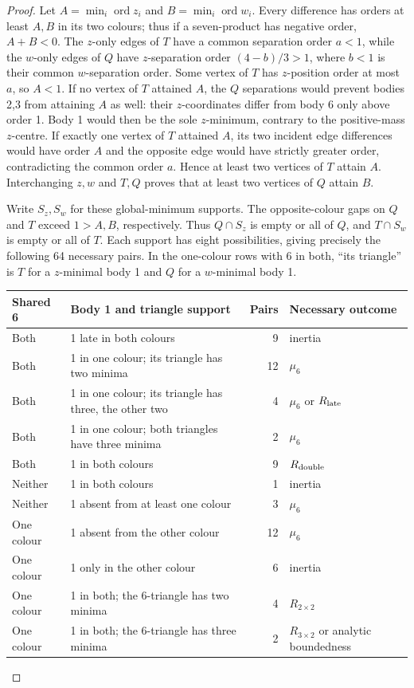 \documentclass[11pt]{amsart}
\theoremstyle{remark}
\newcommand{\ord}{\operatorname{ord}}
\begin{document}
\begin{proof}
Let $A=\min_i\ord z_i$ and $B=\min_i\ord w_i$. Every difference has orders at least $A,B$ in its two colours; thus if a seven-product has negative order, $A+B<0$. The $z$-only edges of $T$ have a common separation order $a<1$, while the $w$-only edges of $Q$ have $z$-separation order $(4-b)/3>1$, where $b<1$ is their common $w$-separation order. Some vertex of $T$ has $z$-position order at most $a$, so $A<1$. If no vertex of $T$ attained $A$, the $Q$ separations would prevent bodies 2,3 from attaining $A$ as well: their $z$-coordinates differ from body 6 only above order 1. Body 1 would then be the sole $z$-minimum, contrary to the positive-mass $z$-centre. If exactly one vertex of $T$ attained $A$, its two incident edge differences would have order $A$ and the opposite edge would have strictly greater order, contradicting the common order $a$. Hence at least two vertices of $T$ attain $A$. Interchanging $z,w$ and $T,Q$ proves that at least two vertices of $Q$ attain $B$.

Write $S_z,S_w$ for these global-minimum supports. The opposite-colour gaps on $Q$ and $T$ exceed $1>A,B$, respectively. Thus $Q\cap S_z$ is empty or all of $Q$, and $T\cap S_w$ is empty or all of $T$. Each support has eight possibilities, giving precisely the following 64 necessary pairs. In the one-colour rows with 6 in both, ``its triangle'' is $T$ for a $z$-minimal body 1 and $Q$ for a $w$-minimal body 1.

\begin{center}\small
\begin{tabular}{p{1.3cm}p{5.2cm}rp{2cm}}
Shared 6 & Body 1 and triangle support & Pairs & Necessary outcome 
\\
\hline
Both & 1 late in both colours & 9 & inertia 
\\
Both & 1 in one colour; its triangle has two minima & 12 & $\mu_6$ 
\\
Both & 1 in one colour; its triangle has three, the other two & 4 & $\mu_6$ or $R_{\rm late}$ 
\\
Both & 1 in one colour; both triangles have three minima & 2 & $\mu_6$ 
\\
Both & 1 in both colours & 9 & $R_{\rm double}$ 
\\
Neither & 1 in both colours & 1 & inertia 
\\
Neither & 1 absent from at least one colour & 3 & $\mu_6$ 
\\
One colour & 1 absent from the other colour & 12 & $\mu_6$ 
\\
One colour & 1 only in the other colour & 6 & inertia 
\\
One colour & 1 in both; the 6-triangle has two minima & 4 & $R_{2\times2}$ 
\\
One colour & 1 in both; the 6-triangle has three minima & 2 & $R_{3\times2}$ or analytic boundedness 
\\
\end{tabular}


\end{center}
\end{proof}
\end{document}
